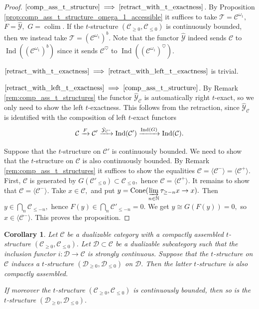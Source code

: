 \documentclass[11pt,leqno]{amsart}
\newcommand{\Implies}[2]{$\text{\ref{#1}}\implies\text{\ref{#2}}$}
\newtheorem{cor}[theo]{Corollary}
\numberwithin{equation}{section}
\def\N{\mathbb{N}}
\DeclareMathOperator*{\colim}{colim}
\newcommand{\indlim}[1][]{\mathop{\varinjlim}\limits_{#1}}
\newcommand{\xto}{\xrightarrow}
\newcommand{\Cone}{\operatorname{Cone}}
\newcommand{\cD}{{\mathcal D}}
\newcommand{\cC}{{\mathcal C}}
\newcommand{\cY}{{\mathcal Y}}
\newcommand{\cT}{{\mathcal T}}
\newcommand{\la}{\langle}
\newcommand{\ra}{\rangle}
\newcommand{\Ind}{\operatorname{Ind}}
\begin{document}
\begin{proof}
\Implies{comp_ass_t_structure}{retract_with_t_exactness}. By Proposition \ref{prop:comp_ass_t_structure_omega_1_accessible} it suffices to take $\cT=\cC^{\omega_1},$ $F=\hat{\cY},$ $G=\colim.$ If the $t$-structure $(\cC_{\geq 0},\cC_{\leq 0})$ is continuously bounded, then we instead take $\cT=(\cC^{\omega_1})^b.$ Note that the functor $\hat{\cY}$ indeed sends $\cC$ to $\Ind((\cC^{\omega_1})^b)$ since it sends $\cC^{\heartsuit}$ to $\Ind((\cC^{\omega_1})^{\heartsuit}).$ 

\Implies{retract_with_t_exactness}{retract_with_left_t_exactness} is trivial.

\Implies{retract_with_left_t_exactness}{comp_ass_t_structure}. By Remark \ref{rem:comp_ass_t_structures} the functor $\hat{\cY}_{\cC}$ is automatically right $t$-exact, so we only need to show the left $t$-exactness. This follows from the retraction, since $\hat{\cY}_{\cC}$ is identified with the composition of left $t$-exact functors 
\begin{equation*}
\cC\xto{F}\cC'\xto{\hat{\cY}_{\cC"}}\Ind(\cC')\xto{\Ind(G)}\Ind(\cC).\qedhere
\end{equation*}

Suppose that the $t$-structure on $\cC'$ is continuously bounded. We need to show that the $t$-structure on $\cC$ is also continuously bounded. By Remark \ref{rem:comp_ass_t_structures} it suffices to show the equalities $\cC=\la\cC^-\ra=\la\cC^+\ra.$ First, $\cC$ is generated by $G(\cC'_{\leq 0})\subset\cC_{\leq 0},$ hence $\cC=\la\cC^+\ra.$ It remains to show that $\cC=\la\cC^-\ra.$ Take $x\in\cC,$ and put $y=\Cone(\indlim[n\in\N]\tau_{\geq -n}x\to x).$ Then $y\in\bigcap\limits_{n}\cC_{\leq -n},$ hence $F(y)\in\bigcap\limits_n \cC'_{\leq -n}=0.$ We get $y\cong G(F(y))=0,$ so $x\in\la\cC^-\ra.$ This proves the proposition.  
\end{proof}

\begin{cor}\label{cor:induced_t_structure_is_compactly_assembled}
Let $\cC$ be a dualizable category with a compactly assembled $t$-structure $(\cC_{\geq 0},\cC_{\leq 0}).$ Let $\cD\subset\cC$ be a dualizable subcategory such that the inclusion functor $i:\cD\to\cC$ is strongly continuous. Suppose that the $t$-structure on $\cC$ induces a $t$-structure $(\cD_{\geq 0},\cD_{\leq 0})$ on $\cD.$ Then the latter $t$-structure is also compactly assembled.

If moreover the $t$-structure $(\cC_{\geq 0},\cC_{\leq 0})$ is continuously bounded, then so is the $t$-structure $(\cD_{\geq 0},\cD_{\leq 0}).$
\end{cor}
\end{document}
